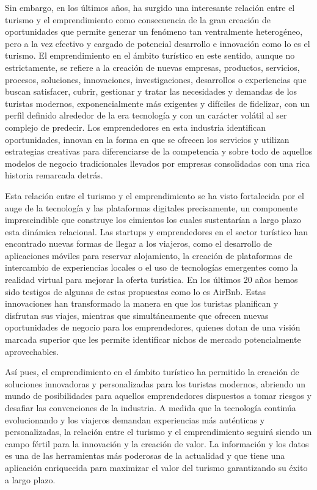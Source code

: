 \documentclass[
  letterpaper,
  DIV=11,
  numbers=noendperiod]{scrreprt}
\begin{document}
Sin embargo, en los últimos años, ha surgido una interesante relación
entre el turismo y el emprendimiento como consecuencia de la gran
creación de oportunidades que permite generar un fenómeno tan
ventralmente heterogéneo, pero a la vez efectivo y cargado de potencial
desarrollo e innovación como lo es el turismo. El emprendimiento en el
ámbito turístico en este sentido, aunque no estrictamente, se refiere a
la creación de nuevas empresas, productos, servicios, procesos,
soluciones, innovaciones, investigaciones, desarrollos o experiencias
que buscan satisfacer, cubrir, gestionar y tratar las necesidades y
demandas de los turistas modernos, exponencialmente más exigentes y
difíciles de fidelizar, con un perfil definido alrededor de la era
tecnología y con un carácter volátil al ser complejo de predecir. Los
emprendedores en esta industria identifican oportunidades, innovan en la
forma en que se ofrecen los servicios y utilizan estrategias creativas
para diferenciarse de la competencia y sobre todo de aquellos modelos de
negocio tradicionales llevados por empresas consolidadas con una rica
historia remarcada detrás.

Esta relación entre el turismo y el emprendimiento se ha visto
fortalecida por el auge de la tecnología y las plataformas digitales
precisamente, un componente imprescindible que construye los cimientos
los cuales sustentarían a largo plazo esta dinámica relacional. Las
startups y emprendedores en el sector turístico han encontrado nuevas
formas de llegar a los viajeros, como el desarrollo de aplicaciones
móviles para reservar alojamiento, la creación de plataformas de
intercambio de experiencias locales o el uso de tecnologías emergentes
como la realidad virtual para mejorar la oferta turística. En los
últimos 20 años hemos sido testigos de algunas de estas propuestas como
lo es AirBnb. Estas innovaciones han transformado la manera en que los
turistas planifican y disfrutan sus viajes, mientras que simultáneamente
que ofrecen nuevas oportunidades de negocio para los emprendedores,
quienes dotan de una visión marcada superior que les permite identificar
nichos de mercado potencialmente aprovechables.

Así pues, el emprendimiento en el ámbito turístico ha permitido la
creación de soluciones innovadoras y personalizadas para los turistas
modernos, abriendo un mundo de posibilidades para aquellos emprendedores
dispuestos a tomar riesgos y desafiar las convenciones de la industria.
A medida que la tecnología continúa evolucionando y los viajeros
demandan experiencias más auténticas y personalizadas, la relación entre
el turismo y el emprendimiento seguirá siendo un campo fértil para la
innovación y la creación de valor. La información y los datos es una de
las herramientas más poderosas de la actualidad y que tiene una
aplicación enriquecida para maximizar el valor del turismo garantizando
su éxito a largo plazo.
\end{document}
